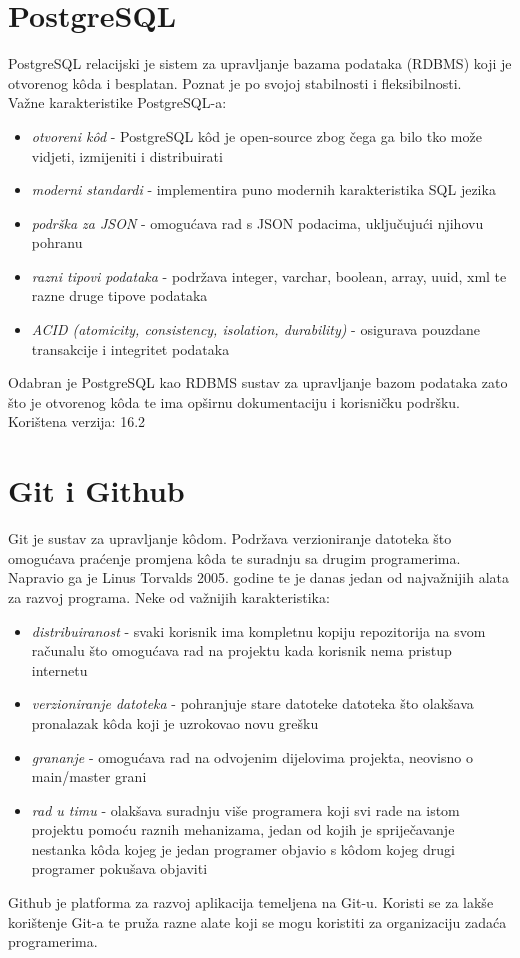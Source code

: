 \documentclass[zavrsnirad]{fer}
\begin{document}
\section{PostgreSQL}
\label{pog:postgresql}
PostgreSQL relacijski je sistem za upravljanje bazama podataka (RDBMS) koji je otvorenog kôda i besplatan. Poznat je po svojoj stabilnosti i fleksibilnosti.
\\Važne karakteristike PostgreSQL-a:
\begin{itemize}
	\item \textit{otvoreni kôd} - PostgreSQL kôd je open-source zbog čega ga bilo tko može vidjeti, izmijeniti i distribuirati
	\item \textit{moderni standardi} - implementira puno modernih karakteristika SQL jezika
	\item \textit{podrška za JSON} - omogućava rad s JSON podacima, uključujući njihovu pohranu
	\item \textit{razni tipovi podataka} - podržava integer, varchar, boolean, array, uuid, xml te razne druge tipove podataka
	\item \textit{ACID (atomicity, consistency, isolation, durability)} - osigurava pouzdane transakcije i integritet podataka
\end{itemize}

Odabran je PostgreSQL kao RDBMS sustav za upravljanje bazom podataka zato što je otvorenog kôda te ima opširnu dokumentaciju i korisničku podršku.
\\Korištena verzija: 16.2

\section{Git i Github}
Git je sustav za upravljanje kôdom. Podržava verzioniranje datoteka što omogućava praćenje promjena kôda te suradnju sa drugim programerima. Napravio ga je Linus Torvalds 2005. godine te je danas jedan od najvažnijih alata za razvoj programa. Neke od važnijih karakteristika:
\begin{itemize}
	\item \textit{distribuiranost} - svaki korisnik ima kompletnu kopiju repozitorija na svom računalu što omogućava rad na projektu kada korisnik nema pristup internetu
	\item \textit{verzioniranje datoteka} - pohranjuje stare datoteke datoteka što olakšava pronalazak kôda koji je uzrokovao novu grešku
	\item \textit{grananje} - omogućava rad na odvojenim dijelovima projekta, neovisno o main/master grani
	\item \textit{rad u timu} - olakšava suradnju više programera koji svi rade na istom projektu pomoću raznih mehanizama, jedan od kojih je spriječavanje nestanka kôda kojeg je jedan programer objavio s kôdom kojeg drugi programer pokušava objaviti
\end{itemize}
Github je platforma za razvoj aplikacija temeljena na Git-u. Koristi se za lakše korištenje Git-a te pruža razne alate koji se mogu koristiti za organizaciju zadaća programerima.
\end{document}
